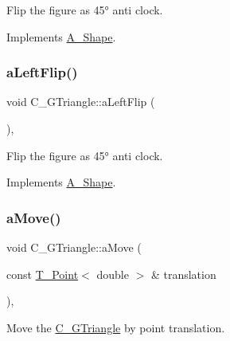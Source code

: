 Flip the figure as 45° anti clock. 



Implements \hyperlink{classA__Shape_abe947e7003cb63be2b4f6c439533427d}{A\+\_\+\+Shape}.

\mbox{\label{classC__GTriangle_a9ffdddb586b42757ffca6a9ca0c20934}} 
\subsubsection{\texorpdfstring{a\+Left\+Flip()}{aLeftFlip()}\hspace{0.1cm}{\footnotesize\ttfamily [2/2]}}
{\footnotesize\ttfamily void C\+\_\+\+G\+Triangle\+::a\+Left\+Flip (\begin{DoxyParamCaption}{ }\end{DoxyParamCaption})\hspace{0.3cm}{\ttfamily [override]}, {\ttfamily [virtual]}}



Flip the figure as 45° anti clock. 



Implements \hyperlink{classA__Shape_abe947e7003cb63be2b4f6c439533427d}{A\+\_\+\+Shape}.

\mbox{\label{classC__GTriangle_a07789441ce75f81fd4c4649a0115edbe}} 
\subsubsection{\texorpdfstring{a\+Move()}{aMove()}\hspace{0.1cm}{\footnotesize\ttfamily [1/2]}}
{\footnotesize\ttfamily void C\+\_\+\+G\+Triangle\+::a\+Move (\begin{DoxyParamCaption}\item[{const \hyperlink{classT__Point}{T\+\_\+\+Point}$<$ double $>$ \&}]{translation }\end{DoxyParamCaption})\hspace{0.3cm}{\ttfamily [override]}, {\ttfamily [virtual]}}



Move the \hyperlink{classC__GTriangle}{C\+\_\+\+G\+Triangle} by point translation. 


